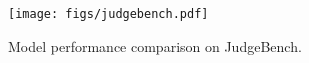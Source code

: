 \begin{figure}
    \centering
    \texttt{[image: figs/judgebench.pdf]}
    \vspace{-8mm}
    \caption{Model performance comparison on JudgeBench.}
    \label{fig:judgebench}
\end{figure}
